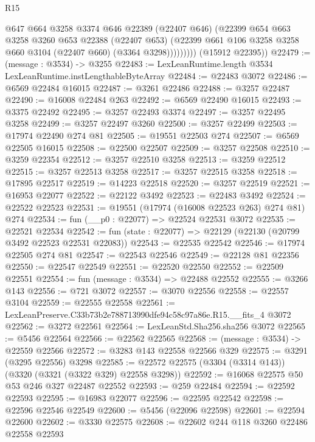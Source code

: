 \begin{lexlean}{R15}
\begin{coremodule}
                  @647
                  @664
                  @3258
                  @3374
                  @646
                  @22389
                  (@22407 @646)
                  (@22399
                    @654
                    @663
                    @3258
                    @3260
                    @653
                    @22388
                    (@22407 @653)
                    (@22399 @661 @106 @3258 @3258 @660 @3104 (@22407 @660) (@3364 @3298)))))))))
      (@15912 @22395))
@22479 := (message : @3534) -> @3255
@22483 := LexLeanRuntime.length @3534 LexLeanRuntime.instLengthableByteArray
@22484 := @22483 @3072
@22486 := @6569 @22484 @16015
@22487 := @3261 @22486
@22488 := @3257 @22487
@22490 := @16008 @22484 @263
@22492 := @6569 @22490 @16015
@22493 := @3375 @22492
@22495 := @3257 @22493 @3374
@22497 := @3257 @22495 @3258
@22499 := @3257 @22497 @3260
@22500 := @3257 @22499
@22503 := @17974 @22490 @274 @81
@22505 := @19551 @22503 @274
@22507 := @6569 @22505 @16015
@22508 := @22500 @22507
@22509 := @3257 @22508
@22510 := @3259 @22354
@22512 := @3257 @22510 @3258
@22513 := @3259 @22512
@22515 := @3257 @22513 @3258
@22517 := @3257 @22515 @3258
@22518 := @17895 @22517
@22519 := @14223 @22518
@22520 := @3257 @22519
@22521 := @16953 @22077
@22522 := @22122 @3492
@22523 := @22483 @3492
@22524 := @22522 @22523
@22531 := @19551 (@17974 (@16008 @22523 @263) @274 @81) @274
@22534 := fun (__p0 : @22077) => @22524 @22531 @3072
@22535 := @22521 @22534
@22542 := fun (state : @22077) => @22129 (@22130 (@20799 @3492 @22523 @22531 @22083))
@22543 := @22535 @22542
@22546 := @17974 @22505 @274 @81
@22547 := @22543 @22546
@22549 := @22128 @81 @22356
@22550 := @22547 @22549
@22551 := @22520 @22550
@22552 := @22509 @22551
@22554 := fun (message : @3534) => @22488 @22552
@22555 := @3266 @143
@22556 := @721 @3072
@22557 := @3070 @22556
@22558 := @22557 @3104
@22559 := @22555 @22558
@22561 := LexLeanPreserve.C33b73b2e788713990dfe94c58c97a86e.R15.__fits_4 @3072
@22562 := @3272 @22561
@22564 := LexLeanStd.Sha256.sha256 @3072
@22565 := @5456 @22564
@22566 := @22562 @22565
@22568 := (message : @3534) -> @22559 @22566
@22572 := @3283 @143 @22558 @22566 @329
@22575 := @3291 (@3295 @22556) @3298
@22585 := @22572 @22575 (@3304 (@3314 @143)) (@3320 (@3321 (@3322 @329) @22558 @3298))
@22592 := @16068 @22575 @50 @53 @246 @327 @22487 @22552
@22593 := @259 @22484
@22594 := @22592 @22593
@22595 := @16983 @22077
@22596 := @22595 @22542
@22598 := @22596 @22546 @22549
@22600 := @5456 (@22096 @22598)
@22601 := @22594 @22600
@22602 := @3330 @22575
@22608 := @22602 @244 @118 @3260 @22486 @22558 @22593

\end{coremodule}
\end{lexlean}

